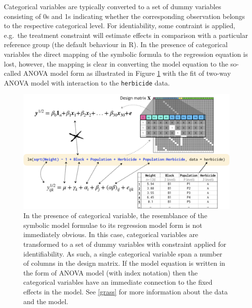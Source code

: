 \documentclass[runningheads]{llncs}
\begin{document}
Categorical variables are typically converted to a set of dummy variables consisting of 0s and 1s indicating whether the corresponding observation belongs to the respective categorical level. For identiability, some contraint is applied, e.g.~the treatment constraint will estimate effects in comparison with a particular reference group (the default behaviour in R). In the presence of categorical variables the direct mapping of the symbolic formula to the regression equation is lost, however, the mapping is clear in converting the model equation to the so-called ANOVA model form as illustrated in Figure \ref{fig:symbolic-lm-factor} with the fit of two-way ANOVA model with interaction to the \texttt{herbicide} data.

\begin{figure}
\includegraphics[width=0.9\linewidth,fbox]{images/symbolic_lm_factor} \caption{In the presence of categorical variable, the resemblance of the symbolic model formulae to its regression model form is not immediately obvious. In this case, categorical variables are transformed to a set of dummy variables with constraint applied for identifiability. As such, a single categorical variable span a number of columns in the design matrix. If the model equation is written in the form of ANOVA model (with index notation) then the categorical variables have an immediate connection to the fixed effects in the model. See \ref{grass} for more information about the data and the model.}\label{fig:symbolic-lm-factor}
\end{figure}
\end{document}

